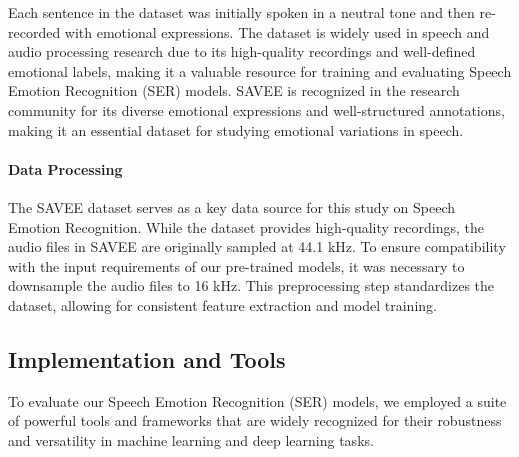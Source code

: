 \documentclass[a4paper,12pt]{article}
\begin{document}
Each sentence in the dataset was initially spoken in a neutral tone and then re-recorded with emotional expressions. The dataset is widely used in speech and audio processing research due to its high-quality recordings and well-defined emotional labels, making it a valuable resource for training and evaluating Speech Emotion Recognition (SER) models. SAVEE is recognized in the research community for its diverse emotional expressions and well-structured annotations, making it an essential dataset for studying emotional variations in speech.


\paragraph{Data Processing}
The SAVEE dataset serves as a key data source for this study on Speech Emotion Recognition. While the dataset provides high-quality recordings, the audio files in SAVEE are originally sampled at 44.1 kHz. To ensure compatibility with the input requirements of our pre-trained models, it was necessary to downsample the audio files to 16 kHz. This preprocessing step standardizes the dataset, allowing for consistent feature extraction and model training.

\subsection{Implementation and Tools}
To evaluate our Speech Emotion Recognition (SER) models, we employed a suite of powerful tools and frameworks that are widely recognized for their robustness and versatility in machine learning and deep learning tasks.
\end{document}
